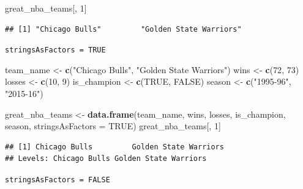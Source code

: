 \documentclass[
]{book}
\newenvironment{Shaded}{\begin{snugshade}}{\end{snugshade}}
\newcommand{\AttributeTok}[1]{\textcolor[rgb]{0.13,0.29,0.53}{#1}}
\newcommand{\ConstantTok}[1]{\textcolor[rgb]{0.56,0.35,0.01}{#1}}
\newcommand{\DecValTok}[1]{\textcolor[rgb]{0.00,0.00,0.81}{#1}}
\newcommand{\FunctionTok}[1]{\textcolor[rgb]{0.13,0.29,0.53}{\textbf{#1}}}
\newcommand{\NormalTok}[1]{#1}
\newcommand{\OtherTok}[1]{\textcolor[rgb]{0.56,0.35,0.01}{#1}}
\newcommand{\StringTok}[1]{\textcolor[rgb]{0.31,0.60,0.02}{#1}}
\theoremstyle{definition}
\theoremstyle{definition}
\theoremstyle{definition}
\theoremstyle{definition}
\theoremstyle{remark}
\begin{document}
\begin{Shaded}
\begin{Highlighting}[]
\NormalTok{great\_nba\_teams[, }\DecValTok{1}\NormalTok{]}
\end{Highlighting}
\end{Shaded}

\begin{verbatim}
## [1] "Chicago Bulls"         "Golden State Warriors"
\end{verbatim}

\texttt{stringsAsFactors\ =\ TRUE}

\begin{Shaded}
\begin{Highlighting}[]
\NormalTok{team\_name }\OtherTok{\textless{}{-}} \FunctionTok{c}\NormalTok{(}\StringTok{"Chicago Bulls"}\NormalTok{, }\StringTok{"Golden State Warriors"}\NormalTok{)}
\NormalTok{wins }\OtherTok{\textless{}{-}} \FunctionTok{c}\NormalTok{(}\DecValTok{72}\NormalTok{, }\DecValTok{73}\NormalTok{)}
\NormalTok{losses }\OtherTok{\textless{}{-}} \FunctionTok{c}\NormalTok{(}\DecValTok{10}\NormalTok{, }\DecValTok{9}\NormalTok{)}
\NormalTok{is\_champion }\OtherTok{\textless{}{-}} \FunctionTok{c}\NormalTok{(}\ConstantTok{TRUE}\NormalTok{, }\ConstantTok{FALSE}\NormalTok{)}
\NormalTok{season }\OtherTok{\textless{}{-}} \FunctionTok{c}\NormalTok{(}\StringTok{"1995{-}96"}\NormalTok{, }\StringTok{"2015{-}16"}\NormalTok{)}
 
\NormalTok{great\_nba\_teams }\OtherTok{\textless{}{-}} \FunctionTok{data.frame}\NormalTok{(team\_name, wins, losses, is\_champion, season, }\AttributeTok{stringsAsFactors =} \ConstantTok{TRUE}\NormalTok{)}
\NormalTok{great\_nba\_teams[, }\DecValTok{1}\NormalTok{]}
\end{Highlighting}
\end{Shaded}

\begin{verbatim}
## [1] Chicago Bulls         Golden State Warriors
## Levels: Chicago Bulls Golden State Warriors
\end{verbatim}

\texttt{stringsAsFactors\ =\ FALSE}
\end{document}
